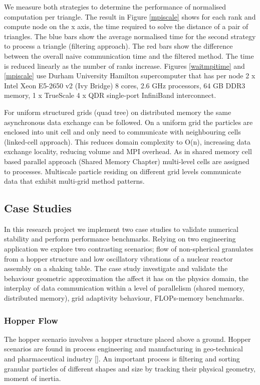 \documentclass[times,12pt]{article}
\begin{document}
We measure both strategies to determine the performance of normalised computation per triangle. The result in Figure \ref{mpiscale} shows for each rank and compute node on the x axis, the time required to solve the distance of a pair of triangles. The blue bars show the average normalised time for the second strategy to process a triangle (filtering approach). The red bars show the difference between the overall naive communication time and the filtered method. The time is reduced linearly as the number of ranks increase. Figures \ref{waitmpitime} and \ref{mpiscale} use Durham University Hamilton supercomputer that has per node 2 x Intel Xeon E5-2650 v2 (Ivy Bridge) 8 cores, 2.6 GHz processors, 64 GB DDR3 memory, 1 x TrueScale 4 x QDR single-port InfiniBand interconnect.

For uniform structured grids (quad tree) on distributed memory the same asynchronous data exchange can be followed. On a uniform grid the particles are enclosed into unit cell and only need to communicate with neighbouring cells (linked-cell approach). This reduces domain complexity to O(n), increasing data exchange locality, reducing volume and MPI overhead. As in shared memory cell based parallel approach (Shared Memory Chapter) multi-level cells are assigned to processes. Multiscale particle residing on different grid levels communicate data that exhibit multi-grid method patterns. 

\subsection{Case Studies}

In this research project we implement two case studies to validate numerical stability and perform performance benchmarks. Relying on two engineering application we explore two contrasting scenarios; flow of non-spherical granulates from a hopper structure and low oscillatory vibrations of a nuclear reactor assembly on a shaking table. The case study investigate and validate the behaviour geometric approximation the affect it has on the physics domain, the interplay of data communication within a level of parallelism (shared memory, distributed memory), grid adaptivity behaviour, FLOPs-memory benchmarks.

\subsubsection{Hopper Flow}

The hopper scenario involves a hopper structure placed above a ground. Hopper scenarios are found in process engineering and manufacturing in geo-technical and pharmaceutical industry []. An important process is filtering and sorting granular particles of different shapes and size by tracking their physical geometry, moment of inertia.
\end{document}
